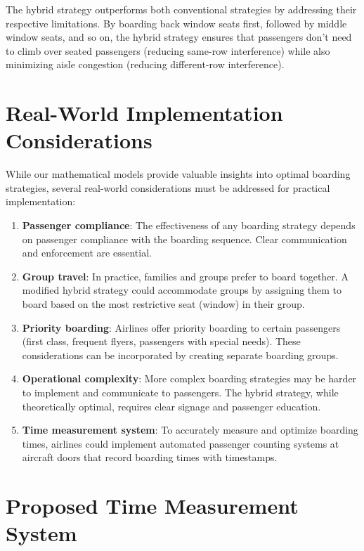\documentclass[12pt]{article}
\begin{document}
The hybrid strategy outperforms both conventional strategies by addressing their respective limitations. By boarding back window seats first, followed by middle window seats, and so on, the hybrid strategy ensures that passengers don't need to climb over seated passengers (reducing same-row interference) while also minimizing aisle congestion (reducing different-row interference).

\section{Real-World Implementation Considerations}

While our mathematical models provide valuable insights into optimal boarding strategies, several real-world considerations must be addressed for practical implementation:

\begin{enumerate}
    \item \textbf{Passenger compliance}: The effectiveness of any boarding strategy depends on passenger compliance with the boarding sequence. Clear communication and enforcement are essential.
    
    \item \textbf{Group travel}: In practice, families and groups prefer to board together. A modified hybrid strategy could accommodate groups by assigning them to board based on the most restrictive seat (window) in their group.
    
    \item \textbf{Priority boarding}: Airlines offer priority boarding to certain passengers (first class, frequent flyers, passengers with special needs). These considerations can be incorporated by creating separate boarding groups.
    
    \item \textbf{Operational complexity}: More complex boarding strategies may be harder to implement and communicate to passengers. The hybrid strategy, while theoretically optimal, requires clear signage and passenger education.
    
    \item \textbf{Time measurement system}: To accurately measure and optimize boarding times, airlines could implement automated passenger counting systems at aircraft doors that record boarding times with timestamps.
\end{enumerate}

\section{Proposed Time Measurement System}
\end{document}
